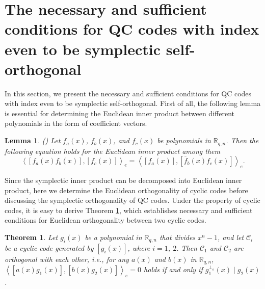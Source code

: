 \documentclass[journal]{IEEEtran}
\newtheorem{lemma}{Lemma}
\newtheorem{theorem}{Theorem}
\begin{document}
\section{The necessary and sufficient conditions for QC codes with index even to be symplectic self-orthogonal}\label{sec3}



In this section, we present the necessary and sufficient conditions for QC codes with index even to be symplectic self-orthogonal. 
First of all, the following lemma is essential for determining the Euclidean inner product between different polynomials in the form of coefficient vectors.


\begin{lemma} \label{commutative_law}(\cite{galindo2018quasi})
	Let $f_a(x)$, $f_b(x)$, and $f_c(x)$ be polynomials in $\mathbb{R}_{q,n}$. Then the following equation holds for the Euclidean inner product among them 
	\begin{equation}
		\left\langle\left[f_a(x) f_b(x)\right],\left[f_c(x)\right]\right\rangle_{e}=\left\langle\left[f_a(x)\right],\left[\overline{f}_b(x) f_c(x)\right]\right\rangle_{e}.
	\end{equation}
\end{lemma}

Since the symplectic inner product can be decomposed into Euclidean inner product, here we determine the Euclidean orthogonality of cyclic codes before discussing the symplectic orthogonality of QC codes. Under the property of cyclic codes, it is easy to derive Theorem \ref{cornerstone}, which establishes necessary and sufficient conditions for Euclidean orthogonality between two cyclic codes.

\begin{theorem}\label{cornerstone}
	Let $g_i(x)$ be a polynomial in $\mathbb{R}_{q,n}$ that divides $x^{n}-1$, and let $\mathscr{C}_i$ be a cyclic code generated by $\left[g_i(x)\right]$, where $i=1$, $2$.
	Then $\mathscr{C}_1$ and $\mathscr{C}_2$ are orthogonal with each other, i.e., for any $a(x)$ and $b(x)$ in $\mathbb{R}_{q,n}$, 
	$\left\langle\left[a(x) g_1(x)\right],\left[b(x) g_2(x)\right]\right\rangle_{e}=0$ holds if and only if $g_1^{\perp_{e}}(x) \mid g_2(x)$.
\end{theorem}
\end{document}
